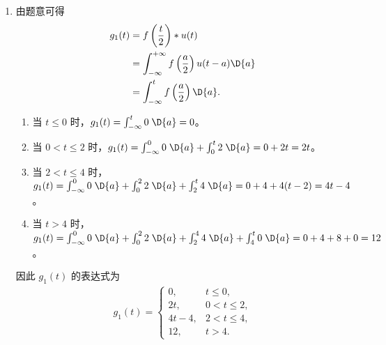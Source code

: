 \begin{solution}
    \begin{enumerate}[label=(\arabic*)]
        \item 由题意可得
            \begin{align*}
                g_1(t) & = f\left(\frac{t}{2}\right) * u(t) \\
                & = \int_{-\infty}^{+\infty}f\left(\frac{a}{2}\right)u(t - a)\D{a} \\
                & = \int_{-\infty}^{t}f\left(\frac{a}{2}\right)\D{a}.
            \end{align*}

            \begin{enumerate}
                \item 当 $t \le 0$ 时，$g_1(t) = \int_{-\infty}^{t}0\;\D{a} = 0$。
                \item 当 $0 < t \le 2$ 时，$g_1(t) = \int_{-\infty}^{0}0\;\D{a} + \int_{0}^{t}2\;\D{a} = 0 + 2t = 2t$。
                \item 当 $2 < t \le 4$ 时，$g_1(t) = \int_{-\infty}^{0}0\;\D{a} + \int_{0}^{2}2\;\D{a} + \int_{2}^{t}4\;\D{a} = 0 + 4 + 4(t - 2) = 4t - 4$。
                \item 当 $t > 4$ 时，$g_1(t) = \int_{-\infty}^{0}0\;\D{a} + \int_{0}^{2}2\;\D{a} + \int_{2}^{4}4\;\D{a} + \int_{4}^{t}0\;\D{a} = 0 + 4 + 8 + 0 = 12$。
            \end{enumerate}

            因此 $g_1(t)$ 的表达式为
            \begin{align*}
                g_1(t) = \begin{cases}
                    0, & t \le 0, \\
                    2t, & 0 < t \le 2, \\
                    4t - 4, & 2 < t \le 4, \\
                    12, & t > 4.
                \end{cases}
            \end{align*}


\end{enumerate}
\end{solution}
